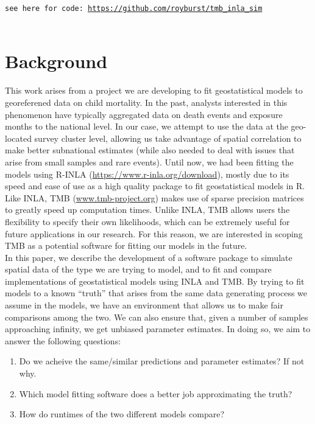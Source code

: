 \documentclass[12pt]{article}
\begin{document}
\maketitle




\texttt{see here for code: \url{https://github.com/royburst/tmb_inla_sim}} \\\


\section{Background}

This work arises from a project we are developing to fit geostatistical models to georeferened data on child mortality. In the past, analysts interested in this phenomenon have typically aggregated data on death events and exposure months to the national level. In our case, we attempt to use the data at the geo-located survey cluster level, allowing us take advantage of spatial correlation to make better subnational estimates (while also needed to deal with issues that arise from small samples and rare events). Until now, we had been fitting the models using R-INLA (\url{https://www.r-inla.org/download}), mostly due to its speed and ease of use as a high quality package to fit geostatistical models in R. Like INLA, TMB (\url{www.tmb-project.org}) makes use of sparse precision matrices to greatly speed up computation times. Unlike INLA, TMB allows users the flexibility to specify their own likelihoods, which can be extremely useful for future applications in our research. For this reason, we are interested in scoping TMB as a potential software for fitting our models in the future.  \\

In this paper, we describe the development of a software package to simulate spatial data of the type we are trying to model, and to fit and compare implementations of geostatistical models using INLA and TMB. By trying to fit models to a known ``truth'' that arises from the same data generating process we assume in the models, we have an environment that allows us to make fair comparisons among the two. We can also ensure that, given a number of samples approaching infinity, we get unbiased parameter estimates. In doing so, we aim to answer the following questions:

\begin{enumerate}
\item Do we acheive the same/similar predictions and parameter estimates? If not why.
\item Which model fitting software does a better job approximating the truth?
\item How do runtimes of the two different models compare?
\end{enumerate}
\end{document}
